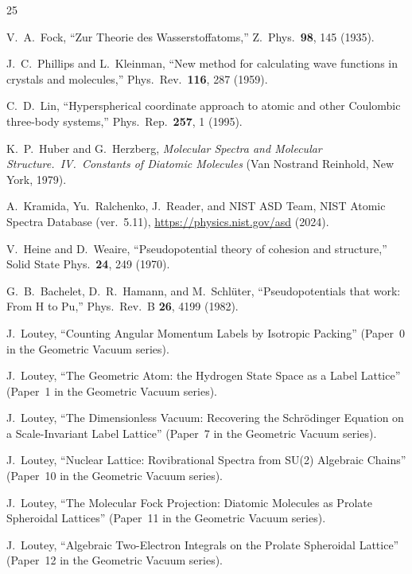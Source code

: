 \documentclass[aps,pra,twocolumn,superscriptaddress,longbibliography,floatfix]{revtex4-2}
\begin{document}
\begin{thebibliography}{25}

V.~A.~Fock,
``Zur Theorie des Wasserstoffatoms,''
Z.~Phys.\ \textbf{98}, 145 (1935).

J.~C.~Phillips and L.~Kleinman,
``New method for calculating wave functions in crystals and molecules,''
Phys.\ Rev.\ \textbf{116}, 287 (1959).

C.~D.~Lin,
``Hyperspherical coordinate approach to atomic and other
Coulombic three-body systems,''
Phys.\ Rep.\ \textbf{257}, 1 (1995).

K.~P.~Huber and G.~Herzberg,
\emph{Molecular Spectra and Molecular Structure.\ IV.\ Constants of
Diatomic Molecules}
(Van Nostrand Reinhold, New York, 1979).

A.~Kramida, Yu.~Ralchenko, J.~Reader, and NIST ASD Team,
NIST Atomic Spectra Database (ver.~5.11),
\url{https://physics.nist.gov/asd} (2024).

V.~Heine and D.~Weaire,
``Pseudopotential theory of cohesion and structure,''
Solid State Phys.\ \textbf{24}, 249 (1970).

G.~B.~Bachelet, D.~R.~Hamann, and M.~Schl\"uter,
``Pseudopotentials that work: From H to Pu,''
Phys.\ Rev.\ B \textbf{26}, 4199 (1982).

J.~Loutey,
``Counting Angular Momentum Labels by Isotropic Packing''
(Paper~0 in the Geometric Vacuum series).

J.~Loutey,
``The Geometric Atom: the Hydrogen State Space as a Label Lattice''
(Paper~1 in the Geometric Vacuum series).

J.~Loutey,
``The Dimensionless Vacuum: Recovering the Schr\"odinger Equation
on a Scale-Invariant Label Lattice''
(Paper~7 in the Geometric Vacuum series).

J.~Loutey,
``Nuclear Lattice: Rovibrational Spectra from SU(2) Algebraic
Chains'' (Paper~10 in the Geometric Vacuum series).

J.~Loutey,
``The Molecular Fock Projection: Diatomic Molecules as Prolate
Spheroidal Lattices''
(Paper~11 in the Geometric Vacuum series).

J.~Loutey,
``Algebraic Two-Electron Integrals on the Prolate Spheroidal
Lattice''
(Paper~12 in the Geometric Vacuum series).


\end{thebibliography}
\end{document}
